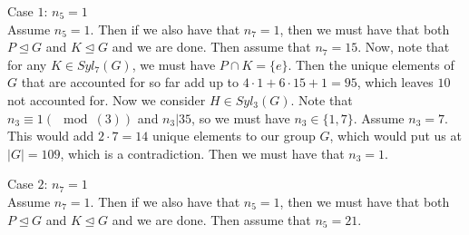 \documentclass{article}
\begin{document}
\begin{enumerate}
\begin{enumerate}
        Case $1$: $n_5=1$ \\
        Assume $n_5=1$. Then if we also have that $n_7 = 1$, then we must have that both $P \trianglelefteq G$ and $K \trianglelefteq G$ 
        and we are done. Then assume that $n_7 = 15$. Now, note that for any $K \in Syl_7(G)$, we must have $P \cap K = \{e\}$. Then the
        unique elements of $G$ that are accounted for so far add up to $4 \cdot 1 + 6 \cdot 15 + 1 = 95$, which leaves $10$ not accounted
        for. Now we consider $H \in Syl_3(G)$. Note that $n_3 \equiv 1(\mod{(3)})$ and $n_3 \big| 35$, so we must have $n_3 \in \{1,7\}$.
        Assume $n_3=7$. This would add $2 \cdot 7 = 14$ unique elements to our group $G$, which would put us at $|G|=109$, which is a
        contradiction. Then we must have that $n_3=1$. 

        Case $2$: $n_7=1$\\
        Assume $n_7 = 1$. Then if we also have that $n_5 = 1$, then we must have that both $P \trianglelefteq G$ and $K \trianglelefteq G$
        and we are done. Then assume that $n_5 = 21$.
    \end{enumerate}
\end{enumerate}
\end{document}
